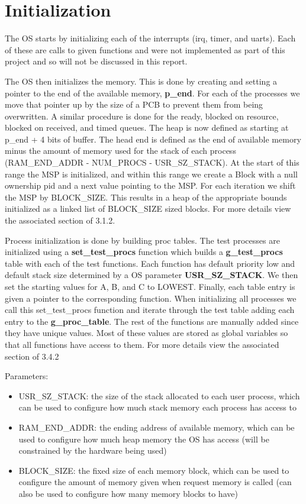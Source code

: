 \documentclass[11pt, oneside]{article}
\begin{document}
\clearpage
\section{Initialization}
The OS starts by initializing each of the interrupts (irq, timer, and uarts). Each of these are calls to given functions and were not implemented as part of this project and so will not be discussed in this report.

The OS then initializes the memory. This is done by creating and setting a pointer to the end of the available memory, \textbf{p\_end}. For each of the processes we move that pointer up by the size of a PCB to prevent them from being overwritten. A similar procedure is done for the ready, blocked on resource, blocked on received, and timed queues. The heap is now defined as starting at p\_end + 4 bits of buffer. The head end is defined as the end of available memory minus the amount of memory used for the stack of each process (RAM\_END\_ADDR - NUM\_PROCS - USR\_SZ\_STACK). At the start of this range the MSP is initialized, and within this range we create a Block with a null ownership pid and a next value pointing to the MSP. For each iteration we shift the MSP by BLOCK\_SIZE. This results in a heap of the appropriate bounds initialized as a linked list of BLOCK\_SIZE sized blocks. For more details view the associated section of 3.1.2.

Process initialization is done by building proc tables. The test processes are initialized using a \textbf{set\_test\_procs} function which builds a \textbf{g\_test\_procs} table with each of the test functions. Each function has default priority low and default stack size determined by a OS parameter \textbf{USR\_SZ\_STACK}. We then set the starting values for A, B, and C to LOWEST. Finally, each table entry is given a pointer to the corresponding function. When initializing all processes we call this set\_test\_procs function and iterate through the test table adding each entry to the \textbf{g\_proc\_table}. The rest of the functions are manually added since they have unique values. Most of these values are stored as global variables so that all functions have access to them. For more details view the associated section of 3.4.2

Parameters:
\begin{itemize}
    \item USR\_SZ\_STACK: the size of the stack allocated to each user process, which can be used to configure how much stack memory each process has access to
    \item RAM\_END\_ADDR: the ending address of available memory, which can be used to configure how much heap memory the OS has access (will be constrained by the hardware being used)
    \item BLOCK\_SIZE: the fixed size of each memory block, which can be used to configure the amount of memory given when request memory is called (can also be used to configure how many memory blocks to have)
\end{itemize}
\end{document}
